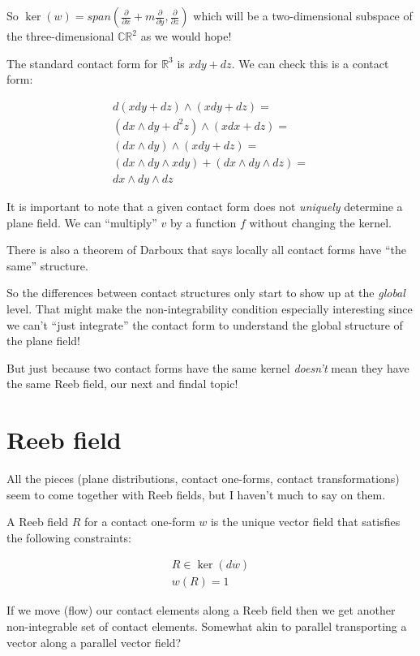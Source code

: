 \documentclass{article}
\begin{document}
So $\ker(w) = span(\frac{\partial}{\partial x} +
    m\frac{\partial}{\partial y}, \frac{\partial}{\partial z})$ which will be a
two-dimensional subspace of the three-dimensional $\mathbb{CR}^{2}$ as we would hope!

The standard contact form for $\mathbb{R}^{3}$ is $xdy + dz$. We can check this
is a contact form:

\begin{align*}
  d (xdy + dz) \wedge (xdy + dz) = \\
  (dx \wedge dy + d^{2} z) \wedge (xdx + dz) = \\
  (dx \wedge dy) \wedge (xdy + dz) = \\
  (dx \wedge dy \wedge xdy) + (dx \wedge dy \wedge dz) = \\
  dx \wedge dy \wedge dz
\end{align*}

It is important to note that a given contact form does not \textit{uniquely}
determine a plane field. We can ``multiply'' $v$ by a function $f$ without
changing the kernel.

There is also a theorem of Darboux that says locally all contact forms have
``the same'' structure.

So the differences between contact structures only start to show up at the
\textit{global} level. That might make the non-integrability condition
especially interesting since we can't ``just integrate'' the contact form to understand
the global structure of the plane field!

But just because two contact forms have the same kernel \textit{doesn't} mean
they have the same Reeb field, our next and findal topic!

\section {Reeb field}

All the pieces (plane distributions, contact one-forms, contact transformations)
seem to come together with Reeb fields, but I haven't much to say on them.

A Reeb field $R$ for a contact one-form $w$ is the unique vector field that satisfies the following constraints:

\begin{gather*}
  R \in \ker(dw) \\
  w(R) = 1
\end{gather*}
  
If we move (flow) our contact elements along a Reeb field then we get another
non-integrable set of contact elements. Somewhat akin to parallel transporting a
vector along a parallel vector field?
\end{document}
